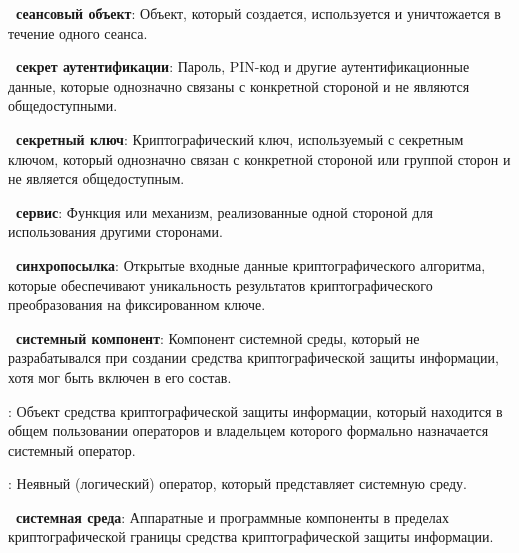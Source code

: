 
{\bf \thedefctr~сеансовый объект}:
Объект, который создается, 
используется и уничтожается в течение одного сеанса.

{\bf \thedefctr~секрет аутентификации}:
Пароль, PIN-код и другие аутентификационные данные, которые однозначно связаны с
конкретной стороной и не являются общедоступными.

{\bf \thedefctr~секретный ключ}:
Криптографический ключ, используемый  
с секретным ключом, который однозначно связан с конкретной стороной или группой
сторон и не является общедоступным.


{\bf \thedefctr~сервис}:
Функция или механизм, реализованные одной стороной для использования другими 
сторонами.

%

{\bf \thedefctr~синхропосылка}:
Открытые входные данные криптографического алгоритма,
которые обеспечивают уникальность результатов 
криптографического преобразования на фиксированном ключе.

{\bf \thedefctr~системный компонент}:
Компонент системной среды, который не разрабатывался при создании средства
криптографической защиты информации, хотя мог быть включен в его состав.

: 
Объект средства криптографической защиты информации, 
который находится в общем пользовании операторов 
и владельцем которого формально назначается системный оператор.

\begin{note}
\end{note}

:
Неявный (логический) оператор, который представляет системную среду.

{\bf \thedefctr~системная среда}:
Аппаратные и программные компоненты в пределах криптографической границы
средства криптографической защиты информации.

